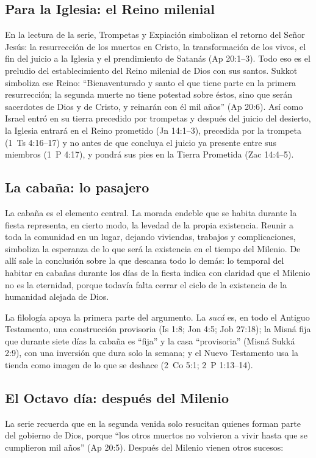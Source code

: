 \documentclass[11pt,letterpaper]{article}
\begin{document}
\subsection{Para la Iglesia: el Reino milenial}
En la lectura de la serie, Trompetas y Expiación simbolizan el retorno del Señor Jesús: la resurrección de los muertos en Cristo, la transformación de los vivos, el fin del juicio a la Iglesia y el prendimiento de Satanás (Ap 20:1--3). Todo eso es el preludio del establecimiento del Reino milenial de Dios con sus santos. Sukkot simboliza ese Reino: ``Bienaventurado y santo el que tiene parte en la primera resurrección; la segunda muerte no tiene potestad sobre éstos, sino que serán sacerdotes de Dios y de Cristo, y reinarán con él mil años'' (Ap 20:6). Así como Israel entró en su tierra precedido por trompetas y después del juicio del desierto, la Iglesia entrará en el Reino prometido (Jn 14:1--3), precedida por la trompeta (1~Ts 4:16--17) y no antes de que concluya el juicio ya presente entre sus miembros (1~P 4:17), y pondrá sus pies en la Tierra Prometida (Zac 14:4--5).

\subsection{La cabaña: lo pasajero}
La cabaña es el elemento central. La morada endeble que se habita durante la fiesta representa, en cierto modo, la levedad de la propia existencia. Reunir a toda la comunidad en un lugar, dejando viviendas, trabajos y complicaciones, simboliza la esperanza de lo que será la existencia en el tiempo del Milenio. De allí sale la conclusión sobre la que descansa todo lo demás: lo temporal del habitar en cabañas durante los días de la fiesta indica con claridad que el Milenio no es la eternidad, porque todavía falta cerrar el ciclo de la existencia de la humanidad alejada de Dios.

La filología apoya la primera parte del argumento. La \emph{sucá} es, en todo el Antiguo Testamento, una construcción provisoria (Is 1:8; Jon 4:5; Job 27:18); la Misná fija que durante siete días la cabaña es ``fija'' y la casa ``provisoria'' (Misná Sukká 2:9), con una inversión que dura solo la semana; y el Nuevo Testamento usa la tienda como imagen de lo que se deshace (2~Co 5:1; 2~P 1:13--14).

\subsection{El Octavo día: después del Milenio}
La serie recuerda que en la segunda venida solo resucitan quienes forman parte del gobierno de Dios, porque ``los otros muertos no volvieron a vivir hasta que se cumplieron mil años'' (Ap 20:5). Después del Milenio vienen otros sucesos:
\end{document}
